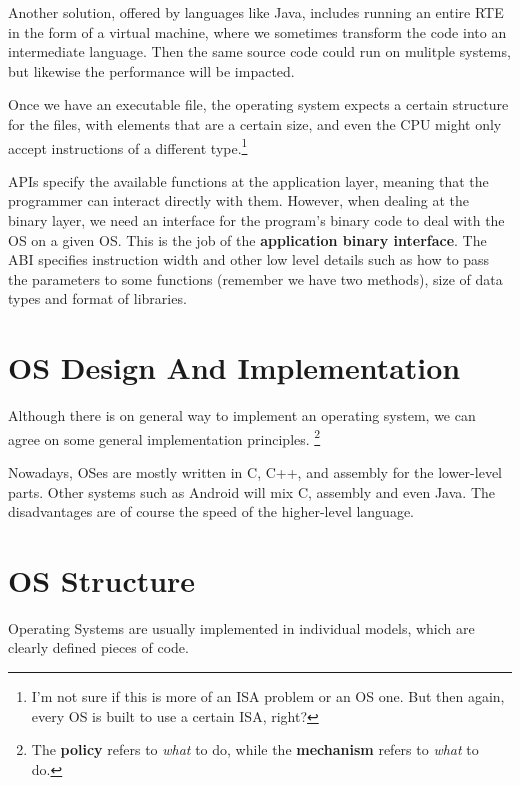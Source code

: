 \documentclass{tufte-handout}
\begin{document}
Another solution, offered by languages like Java, includes running an entire RTE in 
the form of a virtual machine, where we sometimes transform the code into an 
intermediate language. Then the same source code could run on mulitple systems, 
but likewise the performance will be impacted. 

Once we have an executable file, the operating system expects a certain structure
for the files, with elements that are a certain size, and even the CPU might only 
accept instructions of a different type.\footnote{I'm not sure if this is more of an 
ISA problem or an OS one. But then again, every OS is built to use a certain 
ISA, right?}

APIs specify the available functions at the application layer, meaning that the 
programmer can interact directly with them. However, when dealing at the binary
layer, we need an interface for the program's binary code to deal with 
the OS on a given OS. This is the job of the \textbf{application binary interface}.
The ABI specifies instruction width and other low level details such as how to 
pass the parameters to some functions (remember we have two methods), size of data types
and format of libraries.

\section{OS Design And Implementation}
Although there is on general way to implement an operating system, we can agree on some
general implementation principles.
\footnote{The \textbf{policy} refers to \textit{what} to do, while the \textbf{mechanism}
 refers to \textit{what} to do.}

 Nowadays, OSes are mostly written in C, C++, and assembly for the lower-level parts.
 Other systems such as Android will mix C, assembly and even Java. The disadvantages 
 are of course the speed of the higher-level language.
 \section{OS Structure}
 Operating Systems are usually implemented in individual models, which are clearly 
 defined pieces of code. 
\end{document}
